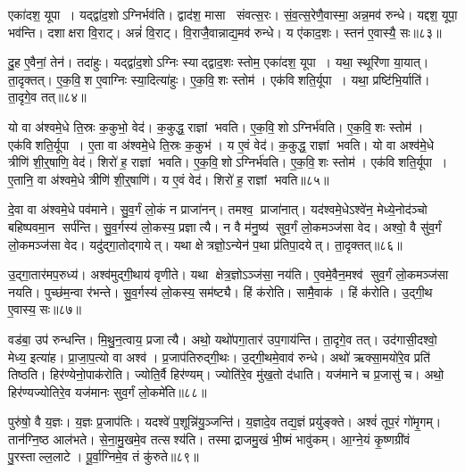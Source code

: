 एका॑दश॒ यूपा। यद्द्वा॑द॒शोऽग्निर्भव॑ति। द्वाद॑श॒ मासा संवत्स॒रः। सं॒व॒त्स॒रेणै॒वास्मा॒ अन्न॒मव॑ रुन्धे। यद्दश॒ यूपा॒ भव॑न्ति। दशाक्षरा वि॒राट्। अन्नं॑ वि॒राट्। वि॒राजै॒वान्नाद्य॒मव॑ रुन्धे। य ए॑काद॒शः। स्तन॑ ए॒वास्यै॒ सः॥८३॥

दु॒ह ए॒वैनां॒ तेन॑। तदा॑हुः। यद्द्वा॑द॒शोऽग्निः स्याद्द्वाद॒शः स्तोम॒ एका॑दश॒ यूपा। यथा॒ स्थूरि॑णा या॒यात्। ता॒दृक्तत्। ए॒क॒वि॒श ए॒वाग्निः स्या॒दित्या॑हुः। ए॒क॒वि॒शः स्तोम॑। एक॑विशति॒र्यूपा। यथा॒ प्रष्टि॑भि॒र्याति॑। ता॒दृगे॒व तत्॥८४॥

यो वा अ॑श्वमे॒धे ति॒स्रः क॒कुभो॒ वेद॑। क॒कुद्ध॒ राज्ञां भवति। ए॒क॒वि॒शोऽग्निर्भ॑वति। ए॒क॒वि॒शः स्तोम॑। एक॑विशति॒र्यूपा। ए॒ता वा अ॑श्वमे॒धे ति॒स्रः क॒कुभ॑। य ए॒वं वेद॑। क॒कुद्ध॒ राज्ञां भवति। यो वा अश्व॑मे॒धे त्रीणि॑ शी॒र्॒षाणि॒ वेद॑। शिरो॑ ह॒ राज्ञां भवति। ए॒क॒वि॒शोऽग्निर्भ॑वति। ए॒क॒वि॒शः स्तोम॑। एक॑विशति॒र्यूपा। ए॒तानि॒ वा अ॑श्वमे॒धे त्रीणि॑ शी॒र्॒षाणि॑। य ए॒वं वेद॑। शिरो॑ ह॒ राज्ञां भवति॥८५॥\anuvakamend[द्वा॒द॒शः स्तोम॒ स ए॒व तच्छिरो॑ ह॒ राज्ञां भवति॒ षट् च॑]

दे॒वा वा अ॑श्वमे॒धे पव॑माने। सु॒व॒र्गं लो॒कं न प्राजा॑नन्। तमश्व॒ प्राजा॑नात्। यद॑श्वमे॒धेऽश्वे॑न॒ मेध्ये॒नोद॑ञ्चो बहिष्पवमा॒न सर्प॑न्ति। सु॒व॒र्गस्य॑ लो॒कस्य॒ प्रज्ञात्यै। न वै म॑नु॒ष्य॑ सुव॒र्गं लो॒कमञ्ज॑सा वेद। अश्वो॒ वै सु॑व॒र्गं लो॒कमञ्ज॑सा वेद। यदु॑द्गा॒तोद्गायेत्। यथा क्षेत्रज्ञो॒ऽन्येन॑ प॒था प्र॑तिपा॒दयेत्। ता॒दृक्तत्॥८६॥

उ॒द्गा॒तार॑मप॒रुध्य॑। अश्व॑मुद्गी॒थाय॑ वृणीते। यथा क्षेत्र॒ज्ञोऽञ्ज॑सा॒ नय॑ति। ए॒वमे॒वैन॒मश्व॑ सुव॒र्गं लो॒कमञ्ज॑सा नयति। पुच्छ॑म॒न्वा र॑भन्ते। सु॒व॒र्गस्य॑ लो॒कस्य॒ सम॑ष्ट्यै। हिं क॑रोति। सामै॒वाक॑। हिं क॑रोति। उ॒द्गी॒थ ए॒वास्य॒ सः॥८७॥

वड॑बा॒ उप॑ रुन्धन्ति। मि॒थु॒न॒त्वाय॒ प्रजात्यै। अथो॒ यथो॑पगा॒तार॑ उप॒गाय॑न्ति। ता॒दृगे॒व तत्। उद॑गासी॒दश्वो॒ मेध्य॒ इत्या॑ह। प्रा॒जा॒प॒त्यो वा अश्व॑। प्र॒जाप॑तिरुद्गी॒थः। उ॒द्गी॒थमे॒वाव॑ रुन्धे। अथो॑ ऋक्सा॒मयो॑रे॒व प्रति॑ तिष्ठति। हिर॑ण्येनो॒पाक॑रोति। ज्योति॒र्वै हिर॑ण्यम्। ज्योति॑रे॒व मु॑ख॒तो द॑धाति। यज॑माने च प्र॒जासु॑ च। अथो॒ हिर॑ण्यज्योतिरे॒व यज॑मानः सुव॒र्गं लो॒कमे॑ति॥८८॥\anuvakamend[तत्स उ॒पाक॑रोति च॒त्वारि॑ च]

पुरु॑षो॒ वै य॒ज्ञः। य॒ज्ञः प्र॒जाप॑तिः। यदश्वे॑ प॒शून्नि॑यु॒ञ्जन्ति॑। य॒ज्ञादे॒व तद्य॒ज्ञं प्रयु॑ङ्क्ते। अश्वं॑ तूप॒रं गो॑मृ॒गम्। तान॑ग्नि॒ष्ठ आल॑भते। से॒ना॒मु॒खमे॒व तत्सश्य॑ति। तस्माद्राजमु॒खं भी॒ष्मं भावु॑कम्। आ॒ग्ने॒यं कृ॒ष्णग्री॑वं पु॒रस्ताल्ल॒लाटे। पू॒र्वा॒ग्निमे॒व तं कु॑रुते॥८९॥


